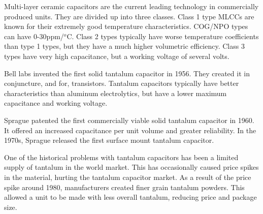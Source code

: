 \noindent Multi-layer ceramic capacitors are the current leading technology in commercially produced units. They are divided up into three classes. Class 1 type MLCCs are known for their extremely good temperature characteristics. COG/NPO types can have 0-30ppm/$^o$C. Class 2 types typically have worse temperature coefficients than type 1 types, but they have a much higher volumetric efficiency. Class 3 types have very high capacitance, but a working voltage of several volts.\cite{hist_cerFilt}\cite[Ch 3 Sec VI]{cerMaterials}\cite{atCer_tempco}

\noindent Bell labs invented the first solid tantalum capacitor in 1956. They created it in conjuncture, and for, transistors.\cite[f.~56-64]{dumInv} Tantalum capacitors typically have better characteristics than aluminum electrolytics, but have a lower maximum capacitance and working voltage.\cite{learn_caps}

\noindent Sprague patented the first commercially viable solid tantalum capacitor in 1960. It offered an increased capacitance per unit volume and greater reliability.\cite{charTant} In the 1970s, Sprague released the first surface mount tantalum capacitor.\cite{spragueHist}

\noindent One of the historical problems with tantalum capacitors has been a limited supply of tantalum in the world market. This has occasionally caused price spikes in the material, hurting the tantalum capacitor market. As a result of the price spike around 1980, manufacturers created finer grain tantalum powders. This allowed a unit to be made with less overall tantalum, reducing price and package size.\cite[ch~3.1]{tantMis}
